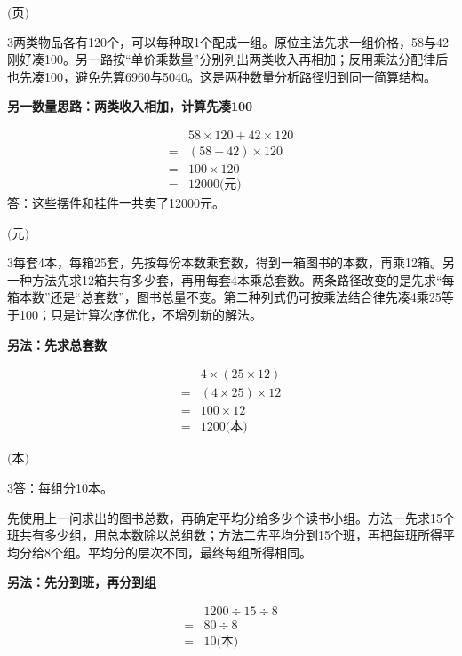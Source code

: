 \documentclass[multi=snippet,border={5bp 20bp 5bp 5bp}]{standalone}
\newenvironment{snippet}[3]{\begin{minipage}{#1bp}\color{answerred}\fontsize{#2}{#3}\selectfont\raggedright}{\end{minipage}}
\begin{document}
\begin{snippet}{80}{10.0}{14}\SourceSans\setlength{\mathindent}{2bp}\(\text{(页)}\)\end{snippet}
\begin{snippet}{505}{11.5}{14}\begin{multicols}{3}\raggedcolumns 两类物品各有120个，可以每种取1个配成一组。原位主法先求一组价格，58与42刚好凑100。另一路按“单价乘数量”分别列出两类收入再相加；反用乘法分配律后也先凑100，避免先算6960与5040。这是两种数量分析路径归到同一简算结构。\par \textbf{另一数量思路：两类收入相加，计算先凑100}\par \[\begin{aligned}&58\times120+42\times120\\={}&(58+42)\times120\\={}&100\times120\\={}&12000\text{(元)}\end{aligned}\]答：这些摆件和挂件一共卖了12000元。\end{multicols}\end{snippet}
\begin{snippet}{80}{10.0}{14}\SourceSans\setlength{\mathindent}{2bp}\(\text{(元)}\)\end{snippet}
\begin{snippet}{505}{11.5}{14}\begin{multicols}{3}\raggedcolumns 每套4本，每箱25套，先按每份本数乘套数，得到一箱图书的本数，再乘12箱。另一种方法先求12箱共有多少套，再用每套4本乘总套数。两条路径改变的是先求“每箱本数”还是“总套数”，图书总量不变。第二种列式仍可按乘法结合律先凑4乘25等于100；只是计算次序优化，不增列新的解法。\par \textbf{另法：先求总套数}\par \[\begin{aligned}&4\times(25\times12)\\={}&(4\times25)\times12\\={}&100\times12\\={}&1200\text{(本)}\end{aligned}\]\end{multicols}\end{snippet}
\begin{snippet}{80}{10.0}{14}\SourceSans\setlength{\mathindent}{2bp}\(\text{(本)}\)\end{snippet}
\begin{snippet}{505}{11.5}{14}\begin{multicols}{3}\raggedcolumns 答：每组分10本。\par 先使用上一问求出的图书总数，再确定平均分给多少个读书小组。方法一先求15个班共有多少组，用总本数除以总组数；方法二先平均分到15个班，再把每班所得平均分给8个组。平均分的层次不同，最终每组所得相同。\par \textbf{另法：先分到班，再分到组}\par \[\begin{aligned} &1200\div15\div8\\={}&80\div8\\={}&10\text{(本)}\end{aligned}\]\end{multicols}\end{snippet}
\end{document}

